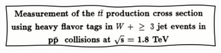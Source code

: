 \begin{columns}[T]
  \begin{column}{0.66\textwidth}
    
  \end{column}
  \begin{column}{0.33\textwidth}
    
    \vspace{0.2cm}
    \includegraphics[width=1.0\textwidth]{./figures/phd_title.png}    
      
  \end{column}
\end{columns}



